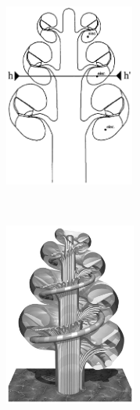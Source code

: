 \begin{figure}
	\begin{subfigure}[t]{0.45\textwidth}
        \centering
        \includegraphics[height=6cm]{Background/frijns_rot-2_schematic}
        \caption{ }
        \label{fig:frijns_rot-2}
    \end{subfigure}%
    ~~~~
    \begin{subfigure}[t]{0.45\textwidth}
        \centering
        \includegraphics[height=6cm]{Background/frijns_spiral_surf}
        \caption{ }
        \label{fig:frijns_spiral}
    \end{subfigure}%
	\vspace{0.5cm}
    

\end{figure}
